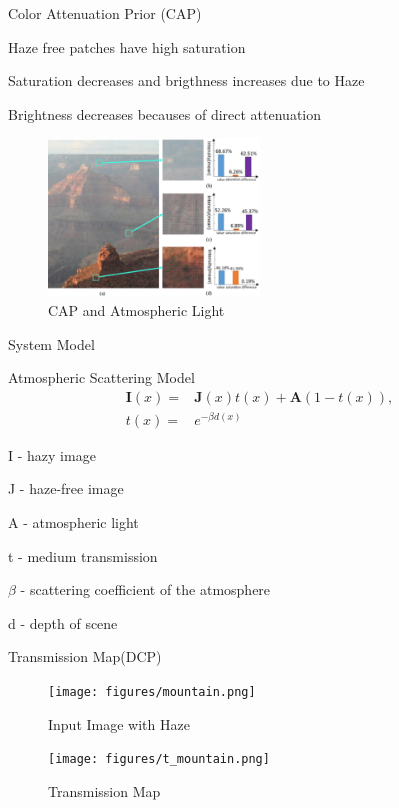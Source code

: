 \documentclass{beamer}
\begin{document}
\begin{frame}[t]{Color Attenuation Prior (CAP)}
\item{Haze free patches have high saturation}
\item{Saturation decreases and brigthness increases due to Haze}
\item{Brightness decreases becauses of direct attenuation}
\begin{figure}[htbp!]
    \centering
    \includegraphics[width=0.5\textwidth]{figures/cap.pdf}
    \caption{CAP and Atmospheric Light}
\end{figure}

\end{frame}
\begin{frame}[t]{System Model}
\item{Atmospheric Scattering Model}
\begin{align} {{\mathbf{I}}}(x)=&{{\mathbf{J}}}(x)t(x)+{{\mathbf{A}}}(1-t(x)),
 \\ t(x)=&e^{-\beta d(x)} 
\end{align}

\item{I - hazy image}
\item{J - haze-free image}
\item{A - atmospheric light}
\item{t - medium transmission}
\item{$\beta$ - scattering coefficient of the atmosphere}
\item{d - depth of scene}

\end{frame}

\begin{frame}[t]{Transmission Map(DCP)}

\begin{figure}[htbp!]
 \begin{minipage}[b]{0.45\linewidth}
    \texttt{[image: figures/mountain.png]}
    \caption{Input Image with Haze}
\end{minipage}
    \begin{minipage}[b]{0.45\linewidth}
    \texttt{[image: figures/t\_mountain.png]}
    \caption{Transmission Map}
	\end{minipage}   
\end{figure}


\end{frame}
\end{document}
